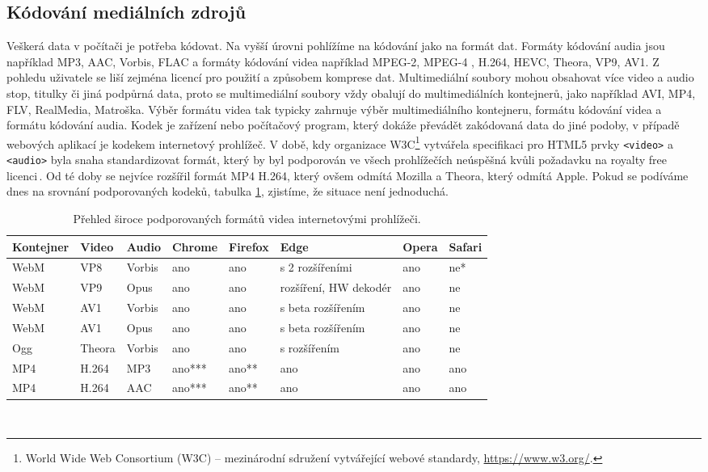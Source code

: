 \subsection{Kódování mediálních zdrojů}
Veškerá data v počítači je potřeba kódovat. Na vyšší úrovni pohlížíme na kódování jako na formát dat. Formáty kódování audia  jsou například MP3, AAC, Vorbis, FLAC a formáty kódování videa například MPEG-2, MPEG-4 , H.264, HEVC, Theora, VP9, AV1.  Z pohledu uživatele se liší zejména licencí pro použití a způsobem komprese dat. Multimediální soubory mohou obsahovat více video a audio stop, titulky či jiná podpůrná data, proto se multimediální soubory vždy obalují do multimediálních kontejnerů, jako například AVI, MP4, FLV, RealMedia, Matroška. Výběr formátu videa tak typicky zahrnuje výběr multimediálního kontejneru, formátu kódování videa a formátu kódování audia. Kodek je zařízení nebo počítačový program, který dokáže převádět zakódovaná data do jiné podoby, v případě webových aplikací je kodekem internetový prohlížeč. V době, kdy organizace W3C\footnote{World Wide Web Consortium (W3C) -- mezinárodní sdružení vytvářející webové standardy, \url{https://www.w3.org/}.} vytvářela specifikaci pro HTML5 prvky \texttt{<video>} a \texttt{<audio>} byla snaha standardizovat formát, který by byl podporován ve všech prohlížečích neúspěšná kvůli požadavku na royalty free licenci\,\cite{HTML5multimedia}. Od té doby se nejvíce rozšířil formát MP4 H.264, který ovšem odmítá Mozilla a Theora, který odmítá Apple. Pokud se podíváme dnes na srovnání podporovaných kodeků, tabulka \ref{tab:codecs}, zjistíme, že situace není jednoduchá.
\begin{table}[h]
    \centering
    \begin{tabular}{|l|l|l||l|l|l|l|l|}
    \hline
    Kontejner   & Video & Audio & Chrome & Firefox & Edge & Opera & Safari \\
    \hline
    WebM        & VP8   & Vorbis &ano & ano & s 2 rozšířeními & ano & ne* \\
    WebM        & VP9   & Opus & ano & ano & rozšíření, HW dekodér & ano & ne \\
    WebM        & AV1   & Vorbis & ano & ano & s beta rozšířením & ano & ne \\
    WebM        & AV1   & Opus & ano & ano & s beta rozšířením & ano & ne \\
    Ogg         & Theora & Vorbis & ano & ano & s rozšířením & ano & ne \\
    MP4         & H.264 & MP3 & ano*** & ano** & ano & ano & ano \\
    MP4         & H.264 & AAC & ano*** & ano** & ano & ano & ano \\
    \hline
    \end{tabular}
    \caption{Přehled široce podporovaných formátů videa internetovými prohlížeči.}
    \label{tab:codecs}
\end{table}\\
